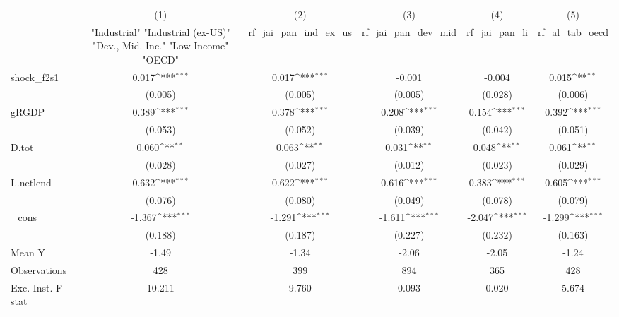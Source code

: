 {
\def\sym#1{\ifmmode^{#1}\else\(^{#1}\)\fi}
\begin{tabular}{l*{5}{c}}
\toprule
            &\multicolumn{1}{c}{(1)}&\multicolumn{1}{c}{(2)}&\multicolumn{1}{c}{(3)}&\multicolumn{1}{c}{(4)}&\multicolumn{1}{c}{(5)}\\
            &\multicolumn{1}{c}{ "Industrial" "Industrial (ex-US)" "Dev., Mid.-Inc." "Low Income" "OECD" }&\multicolumn{1}{c}{rf\_jai\_pan\_ind\_ex\_us}&\multicolumn{1}{c}{rf\_jai\_pan\_dev\_mid}&\multicolumn{1}{c}{rf\_jai\_pan\_li}&\multicolumn{1}{c}{rf\_al\_tab\_oecd}\\
\midrule
shock\_f2s1  &       0.017\sym{***}&       0.017\sym{***}&      -0.001         &      -0.004         &       0.015\sym{**} \\
            &     (0.005)         &     (0.005)         &     (0.005)         &     (0.028)         &     (0.006)         \\
\addlinespace
gRGDP       &       0.389\sym{***}&       0.378\sym{***}&       0.208\sym{***}&       0.154\sym{***}&       0.392\sym{***}\\
            &     (0.053)         &     (0.052)         &     (0.039)         &     (0.042)         &     (0.051)         \\
\addlinespace
D.tot       &       0.060\sym{**} &       0.063\sym{**} &       0.031\sym{**} &       0.048\sym{**} &       0.061\sym{**} \\
            &     (0.028)         &     (0.027)         &     (0.012)         &     (0.023)         &     (0.029)         \\
\addlinespace
L.netlend   &       0.632\sym{***}&       0.622\sym{***}&       0.616\sym{***}&       0.383\sym{***}&       0.605\sym{***}\\
            &     (0.076)         &     (0.080)         &     (0.049)         &     (0.078)         &     (0.079)         \\
\addlinespace
\_cons      &      -1.367\sym{***}&      -1.291\sym{***}&      -1.611\sym{***}&      -2.047\sym{***}&      -1.299\sym{***}\\
            &     (0.188)         &     (0.187)         &     (0.227)         &     (0.232)         &     (0.163)         \\
\midrule
Mean Y      &       -1.49         &       -1.34         &       -2.06         &       -2.05         &       -1.24         \\
Observations&         428         &         399         &         894         &         365         &         428         \\
Exc. Inst. F-stat&      10.211         &       9.760         &       0.093         &       0.020         &       5.674         \\
\bottomrule
\end{tabular}
}
